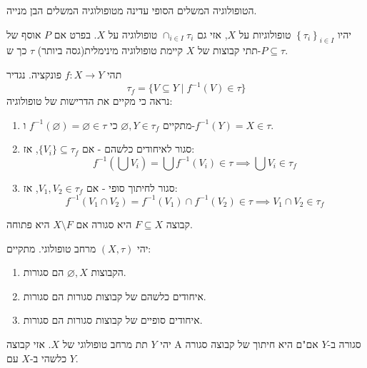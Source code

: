 \documentclass{tstextbook}
\begin{document}
\begin{proposition}
הטופולוגיה המשלים הסופי עדינה מטופולוגיה המשלים הבן מנייה.

\end{proposition}
\begin{example}
יהיו \(\left\{  \tau_{i}  \right\}_{i\in I}\) טופולוגיות על \(X\), אזי גם \(\cap_{i \in I}\tau_{i}\) טופולוגיה על \(X\). בפרט אם \(P\) אוסף של תתי קבוצות של \(X\) קיימת טופולוגיה מינימלית(גסה ביותר) \(\tau\) כך ש-\(P\subseteq \tau\).

\end{example}
\begin{example}
תהי \(f:X\to Y\) פונקציה. נגדיר
$$ \tau_f = \{ V \subseteq Y \mid f^{-1}(V) \in \tau \} $$
נראה כי מקיים את הדרישות של טופולוגיה:

  \begin{enumerate}
    \item מתקיים \(\varnothing, Y \in \tau_f\) כי \(f^{-1}(\varnothing)=\varnothing \in \tau\) ו-\(f^{-1}(Y)=X \in \tau\). 


    \item סגור לאיחודים כלשהם - אם \(\{V_i\} \subseteq \tau_f\), אז: 
$$f^{-1}(\bigcup V_i) = \bigcup f^{-1}(V_i) \in \tau \implies \bigcup V_i \in \tau_f$$


    \item סגור לחיתוך סופי - אם \(V_1, V_2 \in \tau_f\), אז: 
$$f^{-1}(V_1 \cap V_2) = f^{-1}(V_1) \cap f^{-1}(V_2) \in \tau \implies V_1 \cap V_2 \in \tau_f$$


  \end{enumerate}
\end{example}
\begin{definition}
קבוצה \(F\subseteq X\) היא סגורה אם \(X\setminus F\) היא פתוחה.

\end{definition}
\begin{proposition}
יהי \((X,\tau)\) מרחב טופולוגי. מתקיים:

  \begin{enumerate}
    \item הקבוצות \(\varnothing,X\) הם סגורות. 


    \item איחודים כלשהם של קבוצות סגורות הם סגורות. 


    \item איחודים סופיים של קבוצות סגורות הם סגורות. 


  \end{enumerate}
\end{proposition}
\begin{proposition}
יהי \(Y\) תת מרחב טופולוגי של \(X\). אזי קבוצה A סגורה ב-\(Y\) אם"ם היא חיתוך של קבוצה סגורה כלשהי ב-\(X\) עם \(Y\).

\end{proposition}
\end{document}
